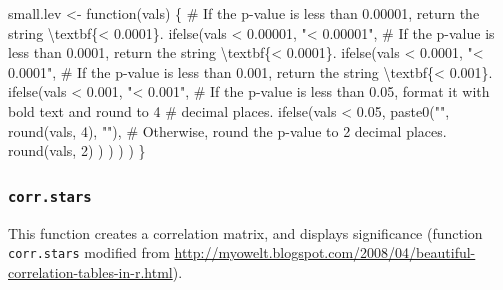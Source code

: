 \documentclass[
  bookmarksnumbered]{article}
\newenvironment{Shaded}{\begin{snugshade}}{\end{snugshade}}
\newcommand{\CommentTok}[1]{\textcolor[rgb]{0.50,0.62,0.50}{#1}}
\newcommand{\ControlFlowTok}[1]{\textcolor[rgb]{0.94,0.87,0.69}{#1}}
\newcommand{\DecValTok}[1]{\textcolor[rgb]{0.86,0.86,0.80}{#1}}
\newcommand{\FloatTok}[1]{\textcolor[rgb]{0.75,0.75,0.82}{#1}}
\newcommand{\FunctionTok}[1]{\textcolor[rgb]{0.94,0.94,0.56}{#1}}
\newcommand{\NormalTok}[1]{\textcolor[rgb]{0.80,0.80,0.80}{#1}}
\newcommand{\OtherTok}[1]{\textcolor[rgb]{0.94,0.94,0.56}{#1}}
\newcommand{\SpecialCharTok}[1]{\textcolor[rgb]{0.86,0.64,0.64}{#1}}
\newcommand{\StringTok}[1]{\textcolor[rgb]{0.80,0.58,0.58}{#1}}
\begin{document}
\begin{Shaded}
\begin{Highlighting}[]
\NormalTok{small.lev }\OtherTok{\textless{}{-}} \ControlFlowTok{function}\NormalTok{(vals) \{}
  \CommentTok{\# If the p{-}value is less than 0.00001, return the string \textquotesingle{}\textbackslash{}textbf\{\textless{} 0.0001\}\textquotesingle{}.}
  \FunctionTok{ifelse}\NormalTok{(vals }\SpecialCharTok{\textless{}} \FloatTok{0.00001}\NormalTok{,}
         \StringTok{"\textless{} 0.00001"}\NormalTok{,}
         \CommentTok{\# If the p{-}value is less than 0.0001, return the string \textquotesingle{}\textbackslash{}textbf\{\textless{} 0.0001\}\textquotesingle{}.}
         \FunctionTok{ifelse}\NormalTok{(vals }\SpecialCharTok{\textless{}} \FloatTok{0.0001}\NormalTok{,}
                \StringTok{"\textless{} 0.0001"}\NormalTok{,}
                \CommentTok{\# If the p{-}value is less than 0.001, return the string \textquotesingle{}\textbackslash{}textbf\{\textless{} 0.001\}\textquotesingle{}.}
                \FunctionTok{ifelse}\NormalTok{(vals }\SpecialCharTok{\textless{}} \FloatTok{0.001}\NormalTok{,}
                       \StringTok{"\textless{} 0.001"}\NormalTok{,}
                       \CommentTok{\# If the p{-}value is less than 0.05, format it with bold text and round to 4}
                       \CommentTok{\# decimal places.}
                       \FunctionTok{ifelse}\NormalTok{(vals }\SpecialCharTok{\textless{}} \FloatTok{0.05}\NormalTok{,}
                              \FunctionTok{paste0}\NormalTok{(}\StringTok{""}\NormalTok{, }\FunctionTok{round}\NormalTok{(vals, }\DecValTok{4}\NormalTok{), }\StringTok{""}\NormalTok{),}
                              \CommentTok{\# Otherwise, round the p{-}value to 2 decimal places.}
                              \FunctionTok{round}\NormalTok{(vals, }\DecValTok{2}\NormalTok{)}
\NormalTok{                       )}
\NormalTok{                )}
\NormalTok{         )}
\NormalTok{  )}
\NormalTok{\}}
\end{Highlighting}
\end{Shaded}

\subsubsection{\texorpdfstring{\texttt{corr.stars}}{corr.stars}}\label{corr.stars}

This function creates a correlation matrix, and displays significance (function \texttt{corr.stars} modified from \url{http://myowelt.blogspot.com/2008/04/beautiful-correlation-tables-in-r.html}).
\end{document}
